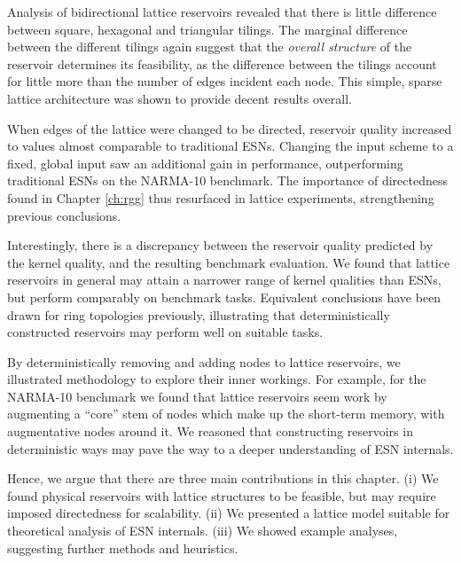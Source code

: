 Analysis of bidirectional lattice reservoirs revealed that there is little
difference between square, hexagonal and triangular tilings. The marginal
difference between the different tilings again suggest that the \textit{overall
structure} of the reservoir determines its feasibility, as the difference
between the tilings account for little more than the number of edges incident
each node. This simple, sparse lattice architecture was shown to provide decent
results overall.

When edges of the lattice were changed to be directed, reservoir quality
increased to values almost comparable to traditional ESNs. Changing the input
scheme to a fixed, global input saw an additional gain in performance,
outperforming traditional ESNs on the NARMA-10 benchmark. The importance of
directedness found in Chapter \ref{ch:rgg} thus resurfaced in lattice
experiments, strengthening previous conclusions.

Interestingly, there is a discrepancy between the reservoir quality predicted by
the kernel quality, and the resulting benchmark evaluation. We found that
lattice reservoirs in general may attain a narrower range of kernel qualities
than ESNs, but perform comparably on benchmark tasks. Equivalent conclusions
have been drawn for ring topologies previously, illustrating that
deterministically constructed reservoirs may perform well on suitable tasks.

By deterministically removing and adding nodes to lattice reservoirs, we
illustrated methodology to explore their inner workings. For example, for the
NARMA-10 benchmark we found that lattice reservoirs seem work by augmenting a
``core'' stem of nodes which make up the short-term memory, with augmentative
nodes around it. We reasoned that constructing reservoirs in deterministic ways
may pave the way to a deeper understanding of ESN internals.

Hence, we argue that there are three main contributions in this chapter. (i) We
found physical reservoirs with lattice structures to be feasible, but may
require imposed directedness for scalability. (ii) We presented a lattice model
suitable for theoretical analysis of ESN internals. (iii) We showed example
analyses, suggesting further methods and heuristics.

